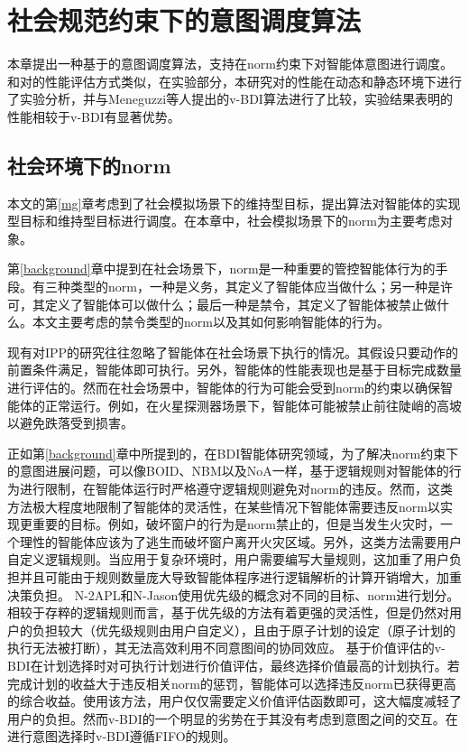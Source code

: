 \chapter{社会规范约束下的意图调度算法}\label{norm}
本章提出一种基于\SA 的意图调度算法\SAN ，\SAN 支持在norm约束下对智能体意图进行调度。和对\SAN 的性能评估方式类似，在实验部分，本研究对\SAN 的性能在动态和静态环境下进行了实验分析，并与Meneguzzi等人提出的v-BDI\cite{DBLP:journals/eaai/MeneguzziROVL15}算法进行了比较，实验结果表明\SAN 的性能相较于v-BDI有显著优势。
\section{社会环境下的norm}
本文的第\ref{mg}章考虑到了社会模拟场景下的维持型目标，提出\SAM 算法对智能体的实现型目标和维持型目标进行调度。在本章中，社会模拟场景下的norm为主要考虑对象。

第\ref{background}章中提到在社会场景下，norm是一种重要的管控智能体行为的手段\cite{DBLP:journals/mags/SavarimuthuC11}。有三种类型的norm，一种是义务，其定义了智能体应当做什么；另一种是许可，其定义了智能体可以做什么；最后一种是禁令，其定义了智能体被禁止做什么。本文主要考虑的禁令类型的norm以及其如何影响智能体的行为。

现有对IPP的研究往往忽略了智能体在社会场景下执行的情况。其假设只要动作的前置条件满足，智能体即可执行。另外，智能体的性能表现也是基于目标完成数量进行评估的。然而在社会场景中，智能体的行为可能会受到norm的约束以确保智能体的正常运行。例如，在火星探测器场景下，智能体可能被禁止前往陡峭的高坡以避免跌落受到损害。

正如第\ref{background}章中所提到的，在BDI智能体研究领域，为了解决norm约束下的意图进展问题，可以像BOID\cite{DBLP:conf/agents/BroersenDHHT01}、NBM\cite{DBLP:conf/atal/MeneguzziL09}以及NoA\cite{DBLP:conf/ijcai/KollingbaumN03}一样，基于逻辑规则对智能体的行为进行限制，在智能体运行时严格遵守逻辑规则避免对norm的违反。然而，这类方法极大程度地限制了智能体的灵活性，在某些情况下智能体需要违反norm以实现更重要的目标。例如，破坏窗户的行为是norm禁止的，但是当发生火灾时，一个理性的智能体应该为了逃生而破坏窗户离开火灾区域。另外，这类方法需要用户自定义逻辑规则。当应用于复杂环境时，用户需要编写大量规则，这加重了用户负担并且可能由于规则数量庞大导致智能体程序进行逻辑解析的计算开销增大，加重决策负担。
N-2APL\cite{DBLP:conf/aamas/AlechinaDL12}和N-Jason\cite{DBLP:conf/dalt/LeePLDA14}使用优先级的概念对不同的目标、norm进行划分。相较于存粹的逻辑规则而言，基于优先级的方法有着更强的灵活性，但是仍然对用户的负担较大（优先级规则由用户自定义），且由于原子计划的设定（原子计划的执行无法被打断），其无法高效利用不同意图间的协同效应。
基于价值评估的v-BDI\cite{DBLP:journals/eaai/MeneguzziROVL15}在计划选择时对可执行计划进行价值评估，最终选择价值最高的计划执行。若完成计划的收益大于违反相关norm的惩罚，智能体可以选择违反norm已获得更高的综合收益。使用该方法，用户仅仅需要定义价值评估函数即可，这大幅度减轻了用户的负担。然而v-BDI的一个明显的劣势在于其没有考虑到意图之间的交互。在进行意图选择时v-BDI遵循FIFO的规则。

